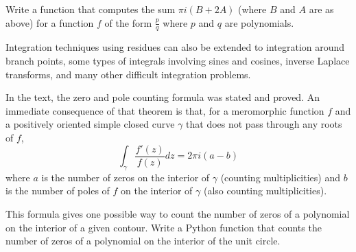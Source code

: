 \begin{problem}
Write a function that computes the sum $\pi i \left(B + 2 A\right)$ (where $B$ and $A$ are as above) for a function $f$ of the form $\frac{p}{q}$ where $p$ and $q$ are polynomials.
\end{problem}

Integration techniques using residues can also be extended to integration around branch points, some types of integrals involving sines and cosines, inverse Laplace transforms, and many other difficult integration problems.

\begin{problem}
In the text, the zero and pole counting formula was stated and proved.
An immediate consequence of that theorem is that, for a meromorphic function $f$ and a positively oriented simple closed curve $\gamma$ that does not pass through any roots of $f$,
\[\int_\gamma \frac{f'\left(z\right)}{f\left(z\right)} dz = 2 \pi i \left(a - b\right)\]
where $a$ is the number of zeros on the interior of $\gamma$ (counting multiplicities) and $b$ is the number of poles of $f$ on the interior of $\gamma$ (also counting multiplicities).

This formula gives one possible way to count the number of zeros of a polynomial on the interior of a given contour.
Write a Python function that counts the number of zeros of a polynomial on the interior of the unit circle.
\end{problem}